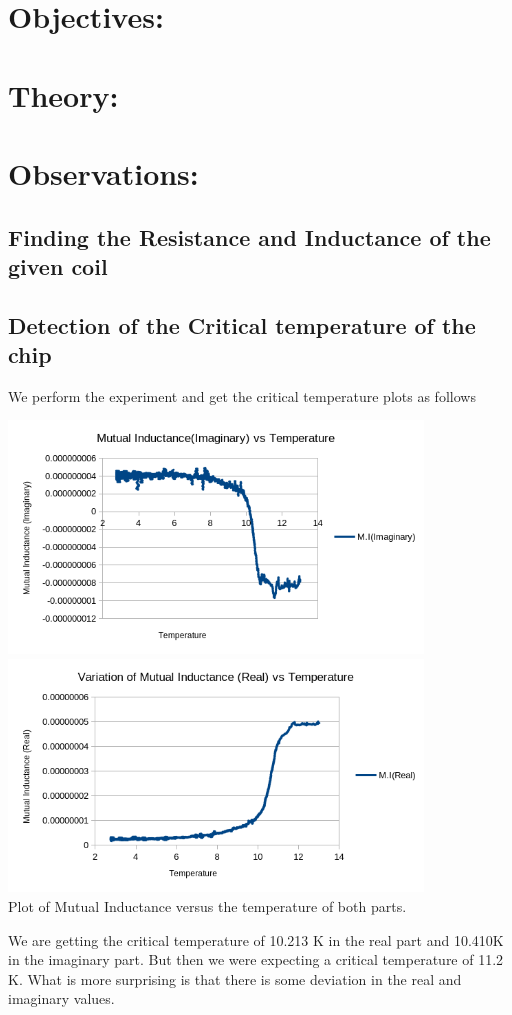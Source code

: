 \documentclass[]{report}[12 pt]
\begin{document}
	
	\section*{Objectives:}

	\section*{Theory:}

	\section*{Observations:}
\subsection*{Finding the Resistance and Inductance of the given coil}
\subsection*{Detection of the Critical temperature of the chip}
We perform the experiment and get the critical temperature plots as follows
\begin{center}
	\includegraphics[width=11cm]{plot1.png}
	\includegraphics[width=11cm]{plot2.png}\\
	Plot of Mutual Inductance versus the temperature of both parts.
\end{center}
	We are getting the critical temperature of 10.213 K in the real part and 10.410K in the imaginary part. But then we were expecting a critical temperature of 11.2 K. What is more surprising is that there is some deviation in the real and imaginary values.
\end{document}
